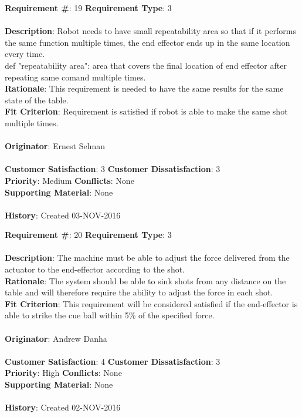 \documentclass[titlepage]{article}
\begin{document}
\begin{framed}
	\noindent\textbf{Requirement \#}: 19 \hfill \textbf{Requirement Type}: 3 \hfill\\\\
	\noindent\textbf{Description}: Robot needs to have small repeatability area so that if it performs the same function multiple times, the end effector ends up in the same location every time. \\def "repeatability area": area that covers the final location of end effector after repeating same comand multiple times.\\
	\textbf{Rationale}: This requirement is needed to have the same results for the same state of the table. \\
	\textbf{Fit Criterion}: Requirement is satisfied if robot is able to make the same shot multiple times. \\\\
	\textbf{Originator}: Ernest Selman\\\\
	\noindent\textbf{Customer Satisfaction}: 3 \hfill 	\textbf{Customer Dissatisfaction}: 3 \hfill\\
	\textbf{Priority}: Medium \hfill \textbf{Conflicts}: None \hfill\\
	\textbf{Supporting Material}: None\\\\
	\noindent\textbf{History}: Created 03-NOV-2016
\end{framed}

\begin{framed}
	\noindent\textbf{Requirement \#}: 20 \hfill \textbf{Requirement Type}: 3 \hfill\\\\
	\noindent\textbf{Description}: The machine must be able to adjust the force delivered from the actuator to the end-effector according to the shot.\\
	\textbf{Rationale}: The system should be able to sink shots from any distance on the table and will therefore require the ability to adjust the force in each shot.\\
	\textbf{Fit Criterion}: This requirement will be considered satisfied if the end-effector is able to strike the cue ball within 5\% of the specified force.\\\\
	\textbf{Originator}: Andrew Danha\\\\
	\noindent\textbf{Customer Satisfaction}: 4 \hfill 	\textbf{Customer Dissatisfaction}: 3 \hfill\\
	\textbf{Priority}: High \hfill \textbf{Conflicts}: None \hfill\\
	\textbf{Supporting Material}: None\\\\
	\noindent\textbf{History}: Created 02-NOV-2016
\end{framed}
\end{document}
